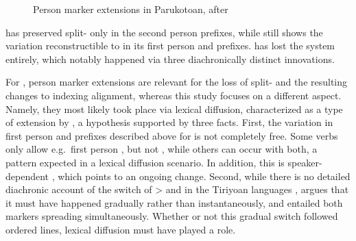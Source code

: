 %
\begin{figure}[hbt]
	\centering
	\setlength{\tabcolsep}{2pt}
	\caption[Person marker extensions in Parukotoan]{Person marker extensions in Parukotoan, after \textcite[94]{gildea1998}}
	\label{fig:par_ext}
\end{figure}
%
\hixka has preserved split- only in the second person prefixes, while \kaxui still shows the variation reconstructible to \PPar in its first person and  prefixes.
\waiwai has lost the system entirely, which notably happened via three diachronically distinct innovations.



For \textcite{gildea1998}, person marker extensions are relevant for the loss of split- and the resulting changes to indexing alignment, whereas this study focuses on a different aspect.
Namely, they most likely took place via lexical diffusion, characterized as a type of extension by \textcite[106--115]{harris1995historical}, a hypothesis supported by three facts.
First, the variation in first person and  prefixes described above for \kaxui is not completely free.
Some verbs only allow e.g.\ first person , but not , while others can occur with both, a pattern expected in a lexical diffusion scenario.
In addition, this is speaker-dependent , which points to an ongoing change.
Second, while there is no detailed diachronic account of the switch of >  and   in the Tiriyoan languages , \textcite[111--112]{meira1998proto} argues that it must have happened gradually rather than instantaneously, and entailed both markers spreading simultaneously.
Whether or not this gradual switch followed ordered lines, lexical diffusion must have played a role.


